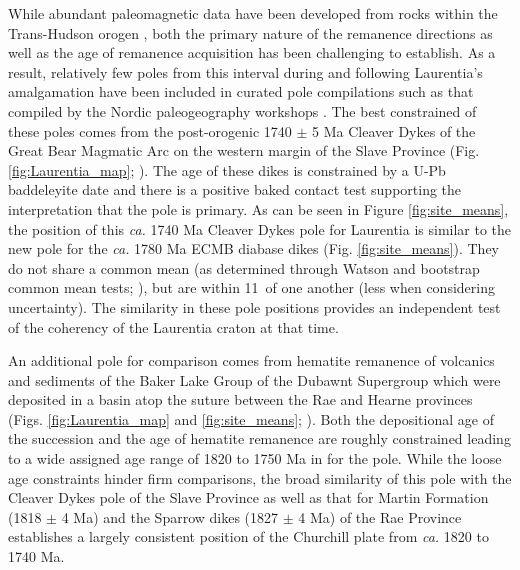 \documentclass[draft]{agujournal2019}
\begin{document}
 While abundant paleomagnetic data have been developed from rocks within the Trans-Hudson orogen \cite{Symons2005a}, both the primary nature of the remanence directions as well as the age of remanence acquisition has been challenging to establish. As a result, relatively few poles from this interval during and following Laurentia's amalgamation have been included in curated pole compilations such as that compiled by the Nordic paleogeography workshops \cite{Evans2021a}. The best constrained of these poles comes from the post-orogenic 1740 $\pm$ 5 Ma Cleaver Dykes of the Great Bear Magmatic Arc on the western margin of the Slave Province (Fig. \ref{fig:Laurentia_map}; ). The age of these dikes is constrained by a U-Pb baddeleyite date and there is a positive baked contact test supporting the interpretation that the pole is primary. As can be seen in Figure \ref{fig:site_means}, the position of this \textit{ca.} 1740 Ma Cleaver Dykes pole for Laurentia \cite{Irving2004a} is similar to the new pole for the \textit{ca.} 1780 Ma ECMB diabase dikes (Fig. \ref{fig:site_means}). They do not share a common mean (as determined through Watson and bootstrap common mean tests; ), but are within 11\textdegree\ of one another (less when considering uncertainty). The similarity in these pole positions provides an independent test of the coherency of the Laurentia craton at that time.
 
 An additional pole for comparison comes from hematite remanence of volcanics and sediments of the Baker Lake Group of the Dubawnt Supergroup which were deposited in a basin atop the suture between the Rae and Hearne provinces (Figs. \ref{fig:Laurentia_map} and \ref{fig:site_means}; ). Both the depositional age of the succession and the age of hematite remanence are roughly constrained leading to a wide assigned age range of 1820 to 1750 Ma in  for the pole. While the loose age constraints hinder firm comparisons, the broad similarity of this pole with the Cleaver Dykes pole of the Slave Province as well as that for Martin Formation (1818 $\pm$ 4 Ma) and the Sparrow dikes (1827 $\pm$ 4 Ma) of the Rae Province establishes a largely consistent position of the Churchill plate from \textit{ca.} 1820 to 1740 Ma. 
 
\end{document}
